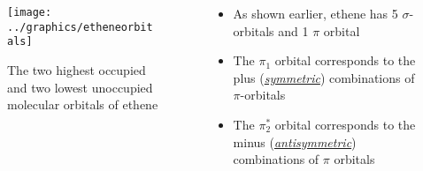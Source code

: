 \documentclass[ignorenonframetext]{beamer}
\begin{document}
\begin{frame}
 {
\begin{columns}[onlytextwidth]
\begin{column}{.4\textwidth}
\begin{figure}[t]
\texttt{[image: ../graphics/etheneorbitals]}
\caption{The two highest occupied and two lowest unoccupied molecular orbitals of ethene}
\end{figure}
\end{column}
\begin{column}{.6\textwidth}
\begin{itemize}
\item As shown earlier, ethene has 5 \(\sigma\)-orbitals and 1 \(\pi\) orbital
\item The \(\pi_1\) orbital corresponds to the plus (\emph{\underline{symmetric}}) combinations of \(\pi\)-orbitals
\item The \(\pi_2^*\) orbital corresponds to the minus (\emph{\underline{antisymmetric}}) combinations of \(\pi\) orbitals
\end{itemize}
\end{column}
\end{columns} 
}
\end{frame}
\end{document}
